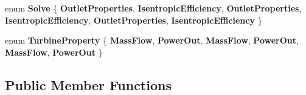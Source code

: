 \begin{DoxyCompactItemize}
enum {\bfseries Solve} \{ \newline
{\bfseries Outlet\+Properties}, 
{\bfseries Isentropic\+Efficiency}, 
{\bfseries Outlet\+Properties}, 
{\bfseries Isentropic\+Efficiency}, 
\newline
{\bfseries Outlet\+Properties}, 
{\bfseries Isentropic\+Efficiency}
 \}
\item 
\mbox{\label{class_turbine_a5db4f65cf2539e3837684d53221ade12}} 
enum {\bfseries Turbine\+Property} \{ \newline
{\bfseries Mass\+Flow}, 
{\bfseries Power\+Out}, 
{\bfseries Mass\+Flow}, 
{\bfseries Power\+Out}, 
\newline
{\bfseries Mass\+Flow}, 
{\bfseries Power\+Out}
 \}
\end{DoxyCompactItemize}
\subsection*{Public Member Functions}
